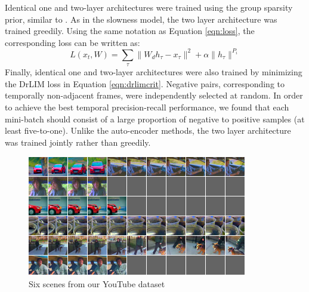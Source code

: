 \documentclass{article} %
\begin{document}
Identical one and two-layer architectures were trained using the group sparsity prior, similar to \cite{groupSparsity}. As in the slowness model, the two layer architecture was trained greedily. Using the same notation as Equation \ref{eqn:loss}, the corresponding loss can be written as:  
\begin{equation}
L(x_t,W)= \sum_{\tau} \|W_d h_\tau - x_\tau\|^2 +\alpha \|h_\tau \|^{P_i} 
\label{eqn:groupL1}
\end{equation} 
Finally, identical one and two-layer architectures were also trained by minimizing the DrLIM loss in Equation \ref{eqn:drlimcrit}. Negative pairs, corresponding to temporally non-adjacent frames, were independently selected at random. In order to achieve the best temporal precision-recall performance, we found that each mini-batch should consist of a large proportion of negative to positive samples (at least five-to-one). Unlike the auto-encoder methods, the two layer architecture was trained jointly rather than greedily.
\begin{figure}
\centering
\includegraphics[scale=0.5]{./Figures/youtube.png}
\caption{Six scenes from our YouTube dataset \label{fig:youtube}}  
\end{figure}
\end{document}
